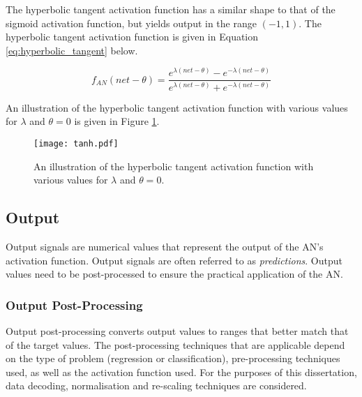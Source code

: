 The hyperbolic tangent activation function has a similar shape to that of the sigmoid activation function, but yields output in the range $(-1, 1)$. The hyperbolic tangent activation function is given in Equation \eqref{eq:hyperbolic_tangent} below.

\begin{equation}
    f_{AN}(net - \theta) = \frac{e^{\lambda(net - \theta)}-e^{-\lambda(net - \theta)}}{e^{\lambda(net - \theta)}+e^{-\lambda(net - \theta)}}
    \label{eq:hyperbolic_tangent}
\end{equation}

\noindent
An illustration of the hyperbolic tangent activation function with various values for $\lambda$ and $\theta = 0$ is given in Figure \ref{fig:anns:activation_functions:hyperbolic_tangent}.


\begin{figure}[htpb]
    \centering
    \texttt{[image: tanh.pdf]}
    \caption[The hyperbolic tangent activation function]{An illustration of the hyperbolic tangent activation function with various values for $\lambda$ and $\theta = 0$.}
    \label{fig:anns:activation_functions:hyperbolic_tangent}
\end{figure}


\subsection{Output}\label{sec:anns:an:output}

Output signals are numerical values that represent the output of the \acs{AN}'s activation function. Output signals are often referred to as \textit{predictions}. Output values need to be post-processed to ensure the practical application of the \ac{AN}.

\subsubsection{Output Post-Processing}\label{sec:anns:an:output:output_post_processing}

Output post-processing converts output values to ranges that better match that of the target values. The post-processing techniques that are applicable depend on the type of problem (regression or classification), pre-processing techniques used, as well as the activation function used. For the purposes of this dissertation, data decoding, normalisation and
re-scaling techniques are considered.



